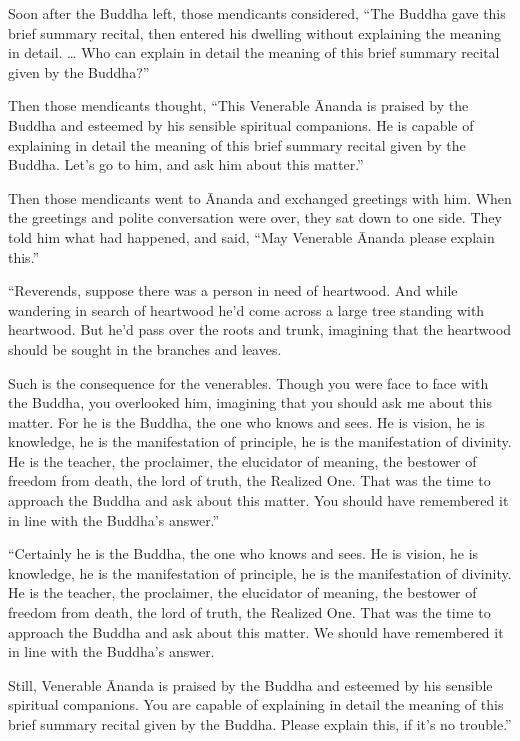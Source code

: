 \documentclass[12pt,openany]{book}%
\begin{document}
Soon after the Buddha left, those mendicants considered, “The Buddha gave this brief summary recital, then entered his dwelling without explaining the meaning in detail. … Who can explain in detail the meaning of this brief summary recital given by the Buddha?” 

Then those mendicants thought, “This Venerable Ānanda is praised by the Buddha and esteemed by his sensible spiritual companions. He is capable of explaining in detail the meaning of this brief summary recital given by the Buddha. Let’s go to him, and ask him about this matter.” 

Then those mendicants went to Ānanda and exchanged greetings with him. When the greetings and polite conversation were over, they sat down to one side. They told him what had happened, and said, “May Venerable Ānanda please explain this.” 

“Reverends, suppose there was a person in need of heartwood. And while wandering in search of heartwood he’d come across a large tree standing with heartwood. But he’d pass over the roots and trunk, imagining that the heartwood should be sought in the branches and leaves. 

Such is the consequence for the venerables. Though you were face to face with the Buddha, you overlooked him, imagining that you should ask me about this matter. For he is the Buddha, the one who knows and sees. He is vision, he is knowledge, he is the manifestation of principle, he is the manifestation of divinity. He is the teacher, the proclaimer, the elucidator of meaning, the bestower of freedom from death, the lord of truth, the Realized One. That was the time to approach the Buddha and ask about this matter. You should have remembered it in line with the Buddha’s answer.” 

“Certainly he is the Buddha, the one who knows and sees. He is vision, he is knowledge, he is the manifestation of principle, he is the manifestation of divinity. He is the teacher, the proclaimer, the elucidator of meaning, the bestower of freedom from death, the lord of truth, the Realized One. That was the time to approach the Buddha and ask about this matter. We should have remembered it in line with the Buddha’s answer. 

Still, Venerable Ānanda is praised by the Buddha and esteemed by his sensible spiritual companions. You are capable of explaining in detail the meaning of this brief summary recital given by the Buddha. Please explain this, if it’s no trouble.” 
\end{document}
